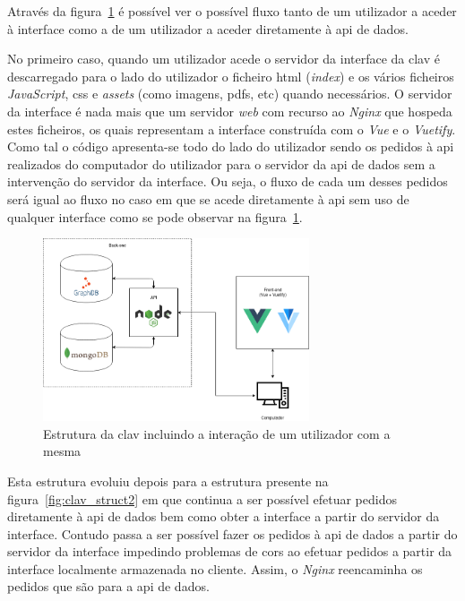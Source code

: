 Através da figura~\ref{fig:clav_struct} é possível ver o possível fluxo tanto de um utilizador a aceder à 
interface como a de um utilizador a aceder diretamente à \acrshort{api} de dados. 

No primeiro caso, quando um utilizador acede o servidor da interface da \acrshort{clav} é descarregado para o 
lado do utilizador o ficheiro \acrshort{html} (\textit{index}) e os vários ficheiros \textit{JavaScript}, 
\acrshort{css} e \textit{assets} (como imagens, \acrshort{pdf}s, etc) quando necessários. 
O servidor da interface é nada mais que um servidor \textit{web} com recurso ao \textit{Nginx} que hospeda 
estes ficheiros, os quais representam a interface construída com o \textit{Vue} e o \textit{Vuetify}. 
Como tal o código apresenta-se todo do lado do utilizador sendo os pedidos à \acrshort{api} realizados do 
computador do utilizador para o servidor da \acrshort{api} de dados sem a intervenção do servidor da interface. 
Ou seja, o fluxo de cada um desses pedidos será igual ao fluxo no caso em que se acede diretamente à 
\acrshort{api} sem uso de qualquer interface como se pode observar na figura~\ref{fig:clav_struct}.

\begin{figure}[H]
    \centering
    \includegraphics[width=0.7\textwidth]{img/clav_struct.png}
    \caption{Estrutura da \acrshort{clav} incluindo a interação de um utilizador com a mesma}\label{fig:clav_struct}
\end{figure}

Esta estrutura evoluiu depois para a estrutura presente na figura~\ref{fig:clav_struct2} em que continua a ser 
possível efetuar pedidos diretamente à \acrshort{api} de dados bem como obter a interface a partir do servidor 
da interface. Contudo passa a ser possível fazer os pedidos à \acrshort{api} de dados a partir do servidor da 
interface impedindo problemas de \acrshort{cors} ao efetuar pedidos a partir da interface localmente armazenada 
no cliente. Assim, o \textit{Nginx} reencaminha os pedidos que são para a \acrshort{api} de dados.

